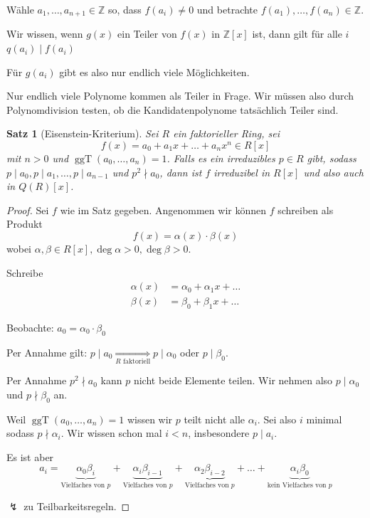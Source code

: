 \documentclass[a4paper,12pt,numbers=noenddot,parskip=full]{scrartcl}
\newcommand{\setZ}{\mathbb{Z}}
\theoremstyle{dotless}
\newtheorem{theorem}{Satz}[section]
\theoremstyle{remark}
\begin{document}
	Wähle $a_1, \dots, a_{n+1} \in \setZ$ so, dass $f(a_i) \neq 0$ und betrachte $f(a_1), \dots, f(a_n) \in \setZ$.
	
	Wir wissen, wenn $g(x)$ ein Teiler von $f(x)$ in $\setZ[x]$ ist, dann gilt für alle $i$ $q(a_i) \mid f(a_i)$
	
	Für $g(a_i)$ gibt es also nur endlich viele Möglichkeiten.
	
	Nur endlich viele Polynome kommen als Teiler in Frage. Wir müssen also durch Polynomdivision testen, ob die Kandidatenpolynome tatsächlich Teiler sind.
	
	\begin{theorem}[Eisenstein-Kriterium]
		Sei $R$ ein faktorieller Ring, sei\begin{equation*}
			f(x) = a_0 + a_1 x + \dots + a_n x^n \in R[x]
		\end{equation*}
		mit $n > 0$ und $\operatorname{ggT}(a_0, \dots, a_n) = 1$. Falls es ein irreduzibles $p \in R$ gibt, sodass $p \mid a_0, p \mid a_1, \dots, p \mid a_{n-1}$ und $p^2 \nmid a_0$, dann ist $f$ irreduzibel in $R[x]$ und also auch in $Q(R)[x]$.
	\end{theorem}

	\begin{proof}
		Sei $f$ wie im Satz gegeben. Angenommen wir können $f$ schreiben als Produkt
		\begin{equation*}
		f(x) = \alpha(x) \cdot \beta(x)
		\end{equation*}
		wobei $\alpha, \beta \in R[x], \deg \alpha > 0, \deg \beta > 0$.
		
		Schreibe
		\begin{align*}
			\alpha(x) &= \alpha_0 + \alpha_1 x + \dots \\
			\beta(x) &= \beta_0 + \beta_1 x + \dots
		\end{align*}
		
		Beobachte: $a_0 = \alpha_0 \cdot \beta_0$
		
		Per Annahme gilt: $p \mid a_0 \underset{\text{$R$ faktoriell}}{\Rightarrow} p \mid \alpha_0$ oder $p \mid \beta_0$.
		
		Per Annahme $p^2 \nmid a_0$ kann $p$ nicht beide Elemente teilen. Wir nehmen also $p \mid \alpha_0$ und $p \nmid \beta_0$ an.
		
		Weil $\operatorname{ggT}(a_0, \dots, a_n) = 1$ wissen wir $p$ teilt nicht alle $\alpha_i$. Sei also $i$ minimal sodass $p \nmid \alpha_i$. Wir wissen schon mal $i < n$, insbesondere $p \mid a_i$.
		
		Es ist aber
		\begin{equation*}
			a_i = \underbrace{\alpha_0 \beta_i}_\text{Vielfaches von $p$} + \underbrace{\alpha_i \beta_{i-1}}_\text{Vielfaches von $p$} + \underbrace{\alpha_2 \beta_{i-2}}_\text{Vielfaches von $p$} + \dots + \underbrace{\alpha_i \beta_0}_\text{kein Vielfaches von $p$}
		\end{equation*}
		
		$\lightning$ zu Teilbarkeitsregeln.
	\end{proof}
\end{document}
